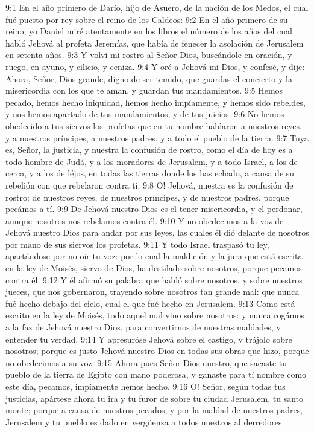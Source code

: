 9:1 En el año primero de Darío, hijo de Asuero, de la nación de los Medos, el cual fué puesto por rey sobre el reino de los Caldeos:
9:2 En el año primero de su reino, yo Daniel miré atentamente en los libros el número de los años del cual habló Jehová al profeta Jeremías, que había de fenecer la asolación de Jerusalem en setenta años.
9:3 Y volví mi rostro al Señor Dios, buscándole en oración, y ruego, en ayuno, y cilicio, y ceniza.
9:4 Y oré a Jehová mi Dios, y confesé, y dije: Ahora, Señor, Dios grande, digno de ser temido, que guardas el concierto y la misericordia con los que te aman, y guardan tus mandamientos.
9:5 Hemos pecado, hemos hecho iniquidad, hemos hecho impíamente, y hemos sido rebeldes, y nos hemos apartado de tus mandamientos, y de tus juicios.
9:6 No hemos obedecido a tus siervos los profetas que en tu nombre hablaron a nuestros reyes, y a nuestros príncipes, a nuestros padres, y a todo el pueblo de la tierra.
9:7 Tuya es, Señor, la justicia, y nuestra la confusión de rostro, como el día de hoy es a todo hombre de Judá, y a los moradores de Jerusalem, y a todo Israel, a los de cerca, y a los de léjos, en todas las tierras donde los has echado, a causa de su rebelión con que rebelaron contra tí.
9:8 O! Jehová, nuestra es la confusión de rostro: de nuestros reyes, de nuestros príncipes, y de nuestros padres, porque pecámos a tí.
9:9 De Jehová nuestro Dios es el tener misericordia, y el perdonar, aunque nosotros nos rebelamos contra él.
9:10 Y no obedecimos a la voz de Jehová nuestro Dios para andar por sus leyes, las cuales él dió delante de nosotros por mano de sus siervos los profetas.
9:11 Y todo Israel traspasó tu ley, apartándose por no oir tu voz: por lo cual la maldición y la jura que está escrita en la ley de Moisés, siervo de Dios, ha destilado sobre nosotros, porque pecamos contra él.
9:12 Y él afirmó su palabra que habló sobre nosotros, y sobre nuestros jueces, que nos gobernaron, trayendo sobre nosotros tan grande mal: que nunca fué hecho debajo del cielo, cual el que fué hecho en Jerusalem.
9:13 Como está escrito en la ley de Moisés, todo aquel mal vino sobre nosotros: y nunca rogámos a la faz de Jehová nuestro Dios, para convertirnos de nuestras maldades, y entender tu verdad.
9:14 Y apresuróse Jehová sobre el castigo, y trájolo sobre nosotros; porque es justo Jehová nuestro Dios en todas sus obras que hizo, porque no obedecimos a su voz.
9:15 Ahora pues Señor Dios nuestro, que sacaste tu pueblo de la tierra de Egipto con mano poderosa, y ganaste para tí nombre como este día, pecamos, impíamente hemos hecho.
9:16 O! Señor, según todas tus justicias, apártese ahora tu ira y tu furor de sobre tu ciudad Jerusalem, tu santo monte; porque a causa de nuestros pecados, y por la maldad de nuestros padres, Jerusalem y tu pueblo es dado en vergüenza a todos nuestros al derredores.

